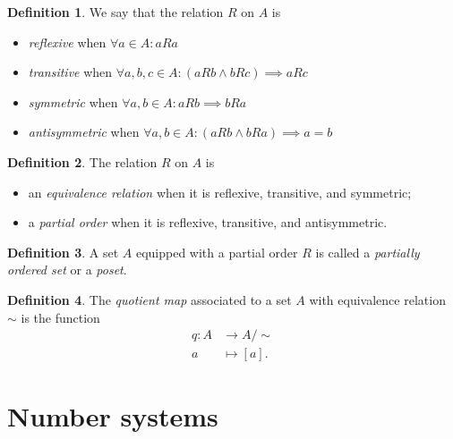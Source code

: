 \documentclass{article}
\theoremstyle{definition}
\newtheorem{definition}{Definition}
\begin{document}
\begin{definition}
	We say that the relation $R$ on $A$ is
	\begin{itemize}
		\item \emph{reflexive} when $\forall a\in A : aRa$
		\item \emph{transitive} when $\forall a,b,c\in A : (aRb\wedge bRc) \implies aRc$
		\item \emph{symmetric} when $\forall a,b\in A : aRb \implies bRa$
		\item \emph{antisymmetric} when $\forall a,b\in A : (aRb \wedge bRa) \implies a=b$
	\end{itemize}
\end{definition}

\begin{definition}
	The relation $R$ on $A$ is
	\begin{itemize}
		\item an \emph{equivalence relation} when it is reflexive, transitive, and symmetric;
		\item a \emph{partial order} when it is reflexive, transitive, and antisymmetric.
	\end{itemize}
\end{definition}

\begin{definition}
	A set $A$ equipped with a partial order $R$ is called a \emph{partially ordered set} or a \emph{poset}.
\end{definition}

\begin{definition}
	The \emph{quotient map} associated to a set $A$ with equivalence relation $\sim$ is the function
	\begin{align*}
		q:	A	&\to		A/\!\sim	\\
			a	&\mapsto	[a].
	\end{align*}
\end{definition}

\section*{Number systems}
\end{document}
